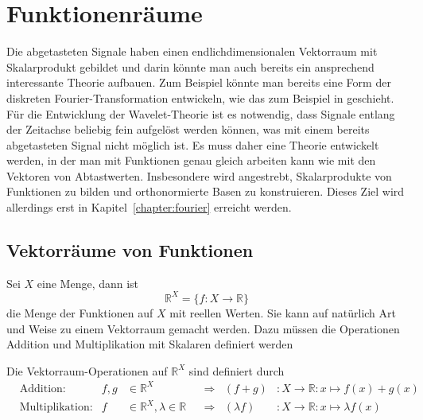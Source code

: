 %
%
%
\section{Funktionenräume%
\label{section:funktionenraume}}
%
Die abgetasteten Signale haben einen endlichdimensionalen Vektorraum
mit Skalarprodukt gebildet und darin könnte man auch bereits ein
ansprechend interessante Theorie aufbauen.
Zum Beispiel könnte man bereits eine Form der diskreten
Fourier-Transformation entwickeln, wie das zum Beispiel in
\cite{buch:mathsem-klima} geschieht.
Für die Entwicklung der Wavelet-Theorie ist es notwendig, dass Signale
entlang der Zeitachse beliebig fein aufgelöst werden können, was
mit einem bereits abgetasteten Signal nicht möglich ist.
Es muss daher eine Theorie entwickelt werden, in der man mit
Funktionen genau gleich arbeiten kann wie mit den Vektoren von
Abtastwerten.
Insbesondere wird angestrebt, Skalarprodukte von Funktionen
zu bilden und orthonormierte Basen zu konstruieren. 
Dieses Ziel wird allerdings erst in Kapitel~\ref{chapter:fourier} erreicht werden.

\subsection{Vektorräume von Funktionen}
Sei $X$ eine Menge, dann ist
\[
\mathbb R^X = \{ f\colon X\to\mathbb R\}
\]
die Menge der Funktionen auf $X$ mit reellen Werten.
Sie kann auf natürlich Art und Weise zu einem Vektorraum gemacht werden.
Dazu müssen die Operationen Addition und Multiplikation mit Skalaren
definiert werden

\begin{definition}
Die Vektorraum-Operationen auf $\mathbb R^X$ sind definiert durch
\[
\begin{aligned}
&\text{Addition:}
&
f,g&\in \mathbb R^X
	&&\Rightarrow
	&(f+g)&\colon X\to\mathbb R:x\mapsto f(x)+g(x)
\\
&\text{Multiplikation:}
&
f&\in\mathbb R^X, \lambda\in\mathbb R
	&&\Rightarrow
	&(\lambda f)&\colon X\to\mathbb R:x\mapsto \lambda f(x)
\end{aligned}
\]
\end{definition}

